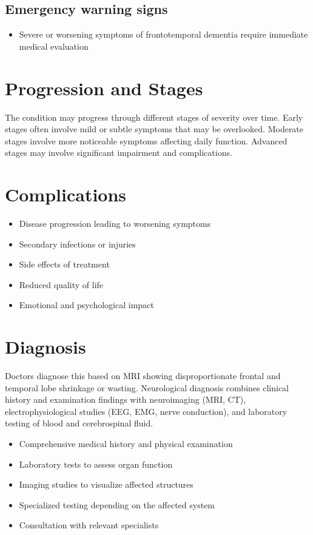 \subsection{Emergency warning signs}
\begin{itemize}[noitemsep]
  \item Severe or worsening symptoms of frontotemporal dementia require immediate medical evaluation
\end{itemize}
\section{Progression and Stages}
The condition may progress through different stages of severity over time. Early stages often involve mild or subtle symptoms that may be overlooked. Moderate stages involve more noticeable symptoms affecting daily function. Advanced stages may involve significant impairment and complications.
\section{Complications}
\begin{itemize}[noitemsep]
  \item Disease progression leading to worsening symptoms
  \item Secondary infections or injuries
  \item Side effects of treatment
  \item Reduced quality of life
  \item Emotional and psychological impact
\end{itemize}
\section{Diagnosis}
Doctors diagnose this based on MRI showing disproportionate frontal and temporal lobe shrinkage or wasting. Neurological diagnosis combines clinical history and examination findings with neuroimaging (MRI, CT), electrophysiological studies (EEG, EMG, nerve conduction), and laboratory testing of blood and cerebrospinal fluid.

\begin{itemize}[noitemsep]
  \item Comprehensive medical history and physical examination
  \item Laboratory tests to assess organ function
  \item Imaging studies to visualize affected structures
  \item Specialized testing depending on the affected system
  \item Consultation with relevant specialists
\end{itemize}
